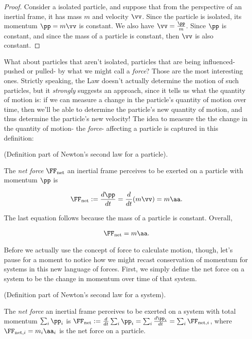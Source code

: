 \documentclass{article}
\begin{document}
\begin{proof}
    Consider a isolated particle, and suppose that from the perspective of an inertial frame, it has mass $m$ and velocity $\vv$. Since the particle is isolated, its momentum $\pp = m\vv$ is constant. We also have $\vv = \frac{\pp}{m}$. Since $\pp$ is constant, and since the mass of a particle is constant, then $\vv$ is also constant.
\end{proof}

What about particles that aren't isolated, particles that are being influenced- pushed or pulled- by what we might call a \textit{force}? Those are the most interesting ones. Strictly speaking, the Law doesn't actually determine the motion of such particles, but it \textit{strongly} suggests an approach, since it tells us what the quantity of motion is: if we can measure a change in the particle's quantity of motion over time, then we'll be able to determine the particle's new quantity of motion, and thus determine the particle's new velocity! The idea to measure the the change in the quantity of motion- the \textit{force}- affecting a particle is captured in this definition:

\begin{defn}
\label{N2_part1_defn}
    (Definition part of Newton's second law for a particle).

    The \textit{net force} $\FF_{\text{net}}$ an inertial frame perceives to be exerted on a particle with momentum $\pp$ is

    \begin{align*}
        \FF_{\text{net}} := \frac{d\pp}{dt} = \frac{d}{dt}(m\vv) = m\aa.
    \end{align*}

    The last equation follows because the mass of a particle is constant. Overall,

    \begin{align*}
        \FF_{\text{net}} = m\aa.
    \end{align*}
\end{defn}

Before we actually use the concept of force to calculate motion, though, let's pause for a moment to notice how we might recast conservation of momentum for systems in this new language of forces. First, we simply define the net force on a system to be the change in momentum over time of that system.

\begin{defn}
\label{N2_part2_system}
    (Definition part of Newton's second law for a system).

    The \textit{net force} an inertial frame perceives to be exerted on a system with total momentum $\sum_i \pp_i$ is $\FF_{\text{net}} := \frac{d}{dt} \sum_i \pp_i = \sum_i \frac{d\pp_i}{dt} =  \sum_i \FF_{\text{net}, i}$, where $\FF_{\text{net}, i} = m_i \aa_i$ is the net force on a particle.
\end{defn}
\end{document}
